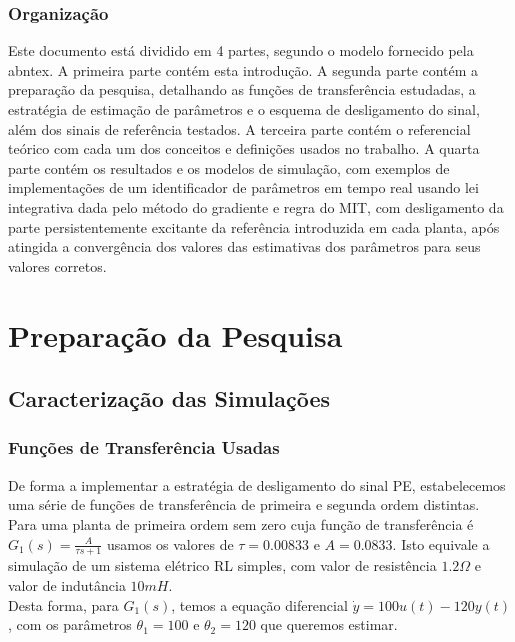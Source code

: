 \documentclass[
	12pt,				%
	openright,			%
	twoside,			%
	a4paper,			%
	english,			%
	french,				%
	spanish,			%
	brazil				%
	]{abntex2}
\begin{document}
\section{Organização}
Este documento está dividido em 4 partes, segundo o modelo fornecido pela abntex. A primeira parte contém esta introdução. A segunda parte contém a preparação da pesquisa, detalhando as funções de transferência estudadas, a estratégia de estimação de parâmetros e o esquema de desligamento do sinal, além dos sinais de referência testados. A terceira parte contém o referencial teórico com cada um dos conceitos e definições usados no trabalho. A quarta parte contém os resultados e os modelos de simulação, com exemplos de implementações
de um identificador de parâmetros em tempo real usando lei integrativa dada pelo método do gradiente
e regra do MIT, com desligamento da parte persistentemente excitante da referência introduzida em cada planta, após atingida a convergência dos valores das estimativas dos parâmetros para seus valores corretos. \\


 
\part{Preparação da Pesquisa}
\chapter{Caracterização das Simulações}
\section{Funções de Transferência Usadas}

 De forma a implementar a estratégia de desligamento do sinal PE, estabelecemos uma série de funções de transferência de primeira e segunda ordem distintas. Para uma planta de primeira ordem sem zero cuja função de transferência é $G_1(s)=\frac{A}{\tau s+1}$ usamos os valores de $\tau=0.00833$ e $A=0.0833$. Isto equivale a simulação de um sistema elétrico RL simples, com valor de resistência $1.2\Omega$ e valor de indutância $10mH$.\\ 
 
 Desta forma, para $G_1(s)$, temos a equação diferencial $\dot{y} = 100u(t) - 120y(t)$, com os parâmetros $\theta_1=100$ e $\theta_2=120$ que queremos estimar.\\
 
\end{document}
